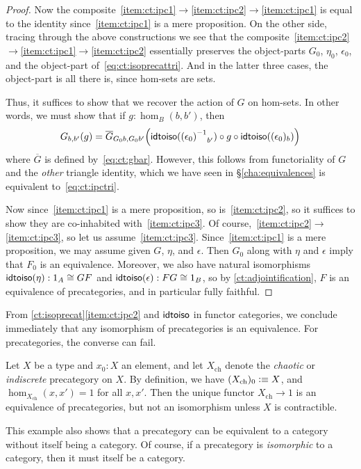 \begin{proof}
  Now the composite~\ref{item:ct:ipc1}$\to$\ref{item:ct:ipc2}$\to$\ref{item:ct:ipc1} is equal to the identity since~\ref{item:ct:ipc1} is a mere proposition.
  On the other side, tracing through the above constructions we see that the composite~\ref{item:ct:ipc2}$\to$\ref{item:ct:ipc1}$\to$\ref{item:ct:ipc2} essentially preserves the object-parts $G_0$, $\eta_0$, $\epsilon_0$, and the object-part of~\eqref{eq:ct:isoprecattri}.
  And in the latter three cases, the object-part is all there is, since hom-sets are sets.

  Thus, it suffices to show that we recover the action of $G$ on hom-sets.
  In other words, we must show that if $g:\hom_B(b,b')$, then
  \[ G_{b,b'}(g) =
  \overline{G}_{G_0b,G_0b'}\Big(\mathsf{idtoiso}(\mathord{{(\epsilon_0)}^{-1}}_{b'}) \circ g \circ \mathsf{idtoiso}((\epsilon_0)_b)\Big)
  \]
  where $\overline{G}$ is defined by~\eqref{eq:ct:gbar}.
  However, this follows from functoriality of $G$ and the \emph{other} triangle identity, which we have seen in \S\ref{cha:equivalences} is equivalent to~\eqref{eq:ct:ipctri}.

  Now since~\ref{item:ct:ipc1} is a mere proposition, so is~\ref{item:ct:ipc2}, so it suffices to show they are co-inhabited with~\ref{item:ct:ipc3}.
  Of course,~\ref{item:ct:ipc2}$\to$\ref{item:ct:ipc3}, so let us assume~\ref{item:ct:ipc3}.
  Since~\ref{item:ct:ipc1} is a mere proposition, we may assume given $G$, $\eta$, and $\epsilon$.
  Then $G_0$ along with $\eta$ and $\epsilon$ imply that $F_0$ is an equivalence.
  Moreover, we also have natural isomorphisms $\mathsf{idtoiso}(\eta):1_A\cong GF$ and $\mathsf{idtoiso}(\epsilon):FG\cong 1_B$, so by \autoref{ct:adjointification}, $F$ is an equivalence of precategories, and in particular fully faithful.
\end{proof}

From \autoref{ct:isoprecat}\ref{item:ct:ipc2} and $\mathsf{idtoiso}$ in functor categories, we conclude immediately that any isomorphism of precategories is an equivalence.
For precategories, the converse can fail.

\begin{eg}\label{ct:chaotic}
  Let $X$ be a type and $x_0:X$ an element, and let $X_{\mathrm{ch}}$ denote the \emph{chaotic} or \emph{indiscrete} precategory on $X$.
  By definition, we have $(X_{\mathrm{ch}})_0\vcentcolon\equiv X$, and $\hom_{X_{\mathrm{ch}}}(x,x') = 1$ for all $x,x'$.
  Then the unique functor $X_{\mathrm{ch}}\to 1$ is an equivalence of precategories, but not an isomorphism unless $X$ is contractible.

  This example also shows that a precategory can be equivalent to a category without itself being a category.
  Of course, if a precategory is \emph{isomorphic} to a category, then it must itself be a category.
\end{eg}

